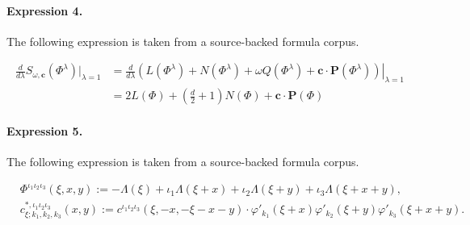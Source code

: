 \documentclass[11pt]{article}
\begin{document}
\paragraph{Expression 4.} The following expression is taken from a source-backed formula corpus.

\begin{align*}\frac{d}{d\lambda}S_{\omega,\mathbf{c}}(\Phi^{\lambda})|_{\lambda=1}&=\frac{d}{d\lambda}\left.\left(L(\Phi^{\lambda})+N(\Phi^{\lambda})+\omega Q(\Phi^{\lambda})+\mathbf{c}\cdot \mathbf{P}(\Phi^{\lambda})\right)\right|_{\lambda =1}\\&=2L(\Phi)+\left(\frac{d}{2}+1\right)N(\Phi)+\mathbf{c}\cdot \mathbf{P}(\Phi)\end{align*}

\paragraph{Expression 5.} The following expression is taken from a source-backed formula corpus.

\begin{align*}& \Phi^{\iota_1\iota_2\iota_3}(\xi,x,y) := -\Lambda(\xi) + \iota_1\Lambda(\xi+x) + \iota_2\Lambda(\xi+y) + \iota_3\Lambda(\xi+x+y),\\& c^{\ast,\iota_1\iota_2\iota_3}_{\xi;k_1,k_2,k_3}(x,y) := c^{\iota_1\iota_2\iota_3}(\xi,-x,-\xi-x-y) \cdot \varphi'_{k_1}(\xi+x) \varphi'_{k_2}(\xi+y)\varphi'_{k_3}(\xi+x+y).\end{align*}
\end{document}
